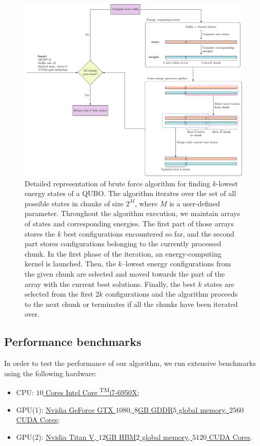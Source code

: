 \begin{figure}
  \includegraphics[width=\textwidth]{figures/bruteforce}
  \caption{
    Detailed representation of brute force algorithm for finding $k$-lowest energy
    states of a QUBO. The algorithm iterates over the set of all possible states in
    chunks of size $2^{M}$, where $M$ is a user-defined parameter. Throughout the
        algorithm execution, we maintain arrays of states and corresponding energies.
        The first part of those arrays stores the $k$ best configurations encountered
        so far, and the second part stores configurations belonging to the currently
        processed chunk. In the first phase of the iteration, an energy-computing
        kernel is launched. Then, the $k$--lowest energy configurations from the given
        chunk are selected and moved towards the part of the array with the current
        best solutions. Finally, the best $k$ states are selected from the first $2k$
    configurations and the algorithm proceeds to the next chunk or terminates if
    all the chunks have been iterated over. } \label{fig:bruteforce}
\end{figure}

\subsection{Performance benchmarks}
In order to test the performance of our algorithm, we run extensive benchmarks
using the following hardware:
%
\begin{itemize}
  \item CPU:
    \href{https://ark.intel.com/products/94456/Intel-Core-i7-6950X-Processor-Extreme-Edition-25M-Cache-up-to-3-50-GHz-}{$10$
      Cores {\rmfamily Intel\textregistered} Core \textsuperscript{TM}i7-6950X};
  \item GPU(1):
    \href{https://www.nvidia.com/en-us/geforce/products/10series/geforce-gtx-1080}{Nvidia
      GeForce GTX $1080$, $8$GB GDDR$5$ global memory, $2560$ CUDA Cores};
  \item  GPU(2): \href{https://www.nvidia.com/en-us/titan/titan-v/}{Nvidia Titan V,
      $12$GB HBM$2$ global memory, $5120$ CUDA Cores}.
\end{itemize}


